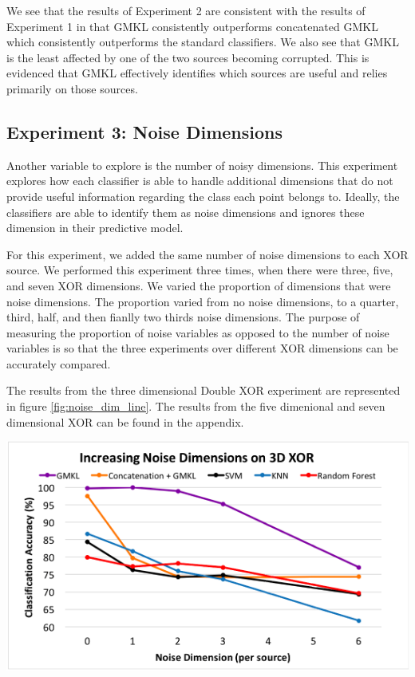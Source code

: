 \documentclass{article}
\begin{document}
We see that the results of Experiment 2 are consistent with the results of Experiment 1 in that GMKL consistently outperforms concatenated GMKL which consistently outperforms the standard classifiers. We also see that GMKL is the least affected by one of the two sources becoming corrupted. This is evidenced that GMKL effectively identifies which sources are useful and relies primarily on those sources.



\subsection*{Experiment 3: Noise Dimensions}

Another variable to explore is the number of noisy dimensions. This experiment explores how each classifier is able to handle additional dimensions that do not provide useful information regarding the class each point belongs to. Ideally, the classifiers are able to identify them as noise dimensions and ignores these dimension in their predictive model.

For this experiment, we added the same number of noise dimensions to each XOR source. We performed this experiment three times, when there were three, five, and seven XOR dimensions. We varied the proportion of dimensions that were noise dimensions. The proportion varied from no noise dimensions, to a quarter, third, half, and then fianlly two thirds noise dimensions. The purpose of measuring the proportion of noise variables as opposed to the number of noise variables is so that the three experiments over different XOR dimensions can be accurately compared.

The results from the three dimensional Double XOR experiment are represented in figure \ref{fig:noise_dim_line}. The results from the five dimenional and seven dimensional XOR can be found in the appendix.

\begin{minipage}{\textwidth}
    \centering
    \includegraphics[scale=0.7]{Noise_Dim_line.png}
    \label{fig:noise_dim_line}
\end{minipage}
\end{document}
